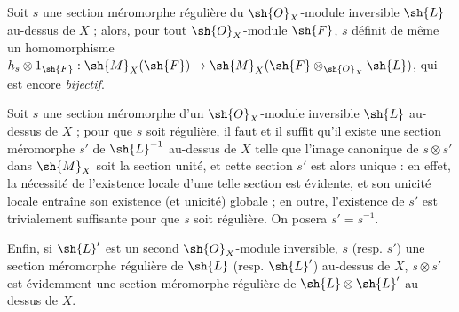 \begin{env}[20.1.9]
\label{IV.20.1.9}
Soit $s$ une section méromorphe régulière du $\sh{O}_X$-module inversible $\sh{L}$ au-dessus de $X$ ; alors, pour tout $\sh{O}_X$-module $\sh{F}$, $s$ définit de même un homomorphisme $h_s\otimes1_{\sh{F}}:\sh{M}_X(\sh{F})\to\sh{M}_X(\sh{F}\otimes_{\sh{O}_X}\sh{L})$, qui est encore \emph{bijectif}.
\end{env}

\begin{env}[20.1.10]
\label{IV.20.1.10}
Soit $s$ une section méromorphe d'un $\sh{O}_X$-module inversible $\sh{L}$ au-dessus de $X$ ; pour que $s$ soit régulière, il faut et il suffit qu'il existe une section méromorphe $s'$ de $\sh{L}^{-1}$ au-dessus de $X$ telle que l'image canonique de $s\otimes s'$ dans $\sh{M}_X$  soit la section unité, et cette section $s'$ est alors unique : en effet, la nécessité de l'existence locale d'une telle section est évidente, et son unicité locale entraîne son existence (et unicité) globale ; en outre, l'existence de $s'$ est trivialement suffisante pour que $s$ soit régulière.
On posera $s'=s^{-1}$.

Enfin, si $\sh{L}'$ est un second $\sh{O}_X$-module inversible, $s$ (resp. $s'$) une section méromorphe régulière de $\sh{L}$ (resp. $\sh{L}'$) au-dessus de $X$, $s\otimes s'$ est évidemment une section méromorphe régulière de $\sh{L}\otimes\sh{L}'$ au-dessus de $X$.
\end{env}


